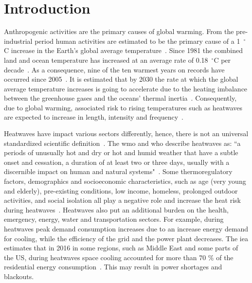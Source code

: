 
\section{Introduction}\label{sec:introduction}

Anthropogenic activities are the primary causes of global warming.
From the pre-industrial period human activities are estimated to be the primary cause of a 1~$^{\circ}$C increase in the Earth's global average temperature~\cite{GlobalWa91:online}.
Since 1981 the combined land and ocean temperature has increased at an average rate of 0.18~$^{\circ}$C per decade~\cite{GlobalCl28:online}.
As a consequence, nine of the ten warmest years on records have occurred since 2005~\cite{ClimateC26:online}.
It is estimated that by 2030 the rate at which the global average temperature increases is going to accelerate due to the heating imbalance between the greenhouse gases and the oceans' thermal inertia~\cite{ClimateC26:online}.
Consequently, due to global warming, associated risk to rising temperatures such as heatwaves are expected to increase in length, intensity and frequency~\cite{Whatharm75:online}.

Heatwaves have impact various sectors differently, hence, there is not an universal standardized scientific definition~\cite{Perkins2013}.
The \ac{wmo} and \ac{who} describe heatwaves as: ``a periods of unusually hot and dry or hot and humid weather that have a subtle onset and cessation, a duration of at least two or three days, usually with a discernible impact on human and natural systems"~\cite{WMO2015}.
Some thermoregulatory factors, demographics and socioeconomic characteristics, such as age (very young and elderly), pre-existing conditions, low income, homeless, prolonged outdoor activities, and social isolation all play a negative role and increase the heat risk during heatwaves~\cite{WMO2015}.
Heatwaves also put an additional burden on the health, emergency, energy, water and transportation sectors.
For example, during heatwaves peak demand consumption increases due to an increase energy demand for cooling, while the efficiency of the grid and the power plant decreases.
The \ac{iea} estimates that in 2016 in some regions, such as Middle East and some parts of the US, during heatwaves space cooling accounted for more than 70 \% of the residential energy consumption~\cite{IEA2018}.
This may result in power shortages and blackouts.

